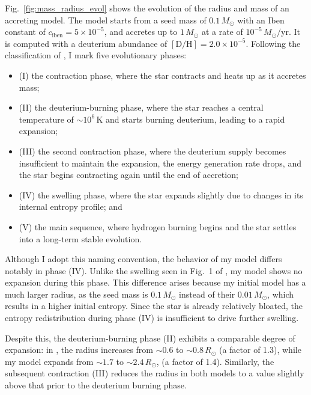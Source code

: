 \documentclass[12pt,a4paper]{article}
\newcommand{\mr}{\mathrm}
\begin{document}
Fig.~\ref{fig:mass_radius_evol} shows the evolution of the radius and mass of an accreting model. The model starts from a seed mass of $0.1\,M_\odot$ with an Iben constant of $c_\mr{iben} = 5\times10^{-5}$, and accretes up to $1\,M_\odot$ at a rate of $10^{-5}\,M_\odot/\mr{yr}$. It is computed with a deuterium abundance of $[\mr{D/H}] = 2.0\times 10^{-5}$. Following the classification of \textcite{KunitomoEtAl2017}, I mark five evolutionary phases:
\begin{itemize}
  \item (I) the contraction phase, where the star contracts and heats up as it accretes mass;
  \item (II) the deuterium-burning phase, where the star reaches a central temperature of $\sim 10^6\,\mr{K}$ and starts burning deuterium, leading to a rapid expansion;
  \item (III) the second contraction phase, where the deuterium supply becomes insufficient to maintain the expansion, the energy generation rate drops, and the star begins contracting again until the end of accretion;
  \item (IV) the swelling phase, where the star expands slightly due to changes in its internal entropy profile; and
  \item (V) the main sequence, where hydrogen burning begins and the star settles into a long-term stable evolution.
\end{itemize}

Although I adopt this naming convention, the behavior of my model differs notably in phase (IV). Unlike the swelling seen in Fig.~1 of \textcite{KunitomoEtAl2017}, my model shows no expansion during this phase. This difference arises because my initial model has a much larger radius, as the seed mass is $0.1\,M_\odot$ instead of their $0.01\,M_\odot$, which results in a higher initial entropy. Since the star is already relatively bloated, the entropy redistribution during phase (IV) is insufficient to drive further swelling.

Despite this, the deuterium-burning phase (II) exhibits a comparable degree of expansion: in \textcite{KunitomoEtAl2017}, the radius increases from $\sim 0.6$ to $\sim 0.8\,R_\odot$ (a factor of 1.3), while my model expands from $\sim 1.7$ to $\sim 2.4\,R_\odot$, (a factor of 1.4). Similarly, the subsequent contraction (III) reduces the radius in both models to a value slightly above that prior to the deuterium burning phase.
\end{document}

